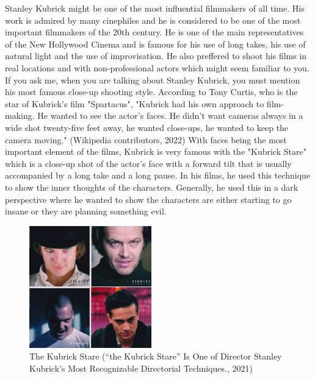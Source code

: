\documentclass[12pt]{article}
\begin{document}
\par
Stanley Kubrick might be one of the most influential filmmakers of all time. His work is admired by many cinephiles and
he is considered to be one of the most important filmmakers of the 20th century.
He is one of the main representatives of the New Hollywood Cinema and is famous for his use of long takes,
his use of natural light and the use of improvisation. He also preffered to shoot his films in real locations
and with non-professional actors which might seem familiar to you.
\\
If you ask me, when you are talking about Stanley Kubrick, you must mention his most famous close-up shooting style. According to Tony Curtis,
who is the star of Kubrick's film "Spartacus", "Kubrick had his own approach to film-making. He wanted to see the actor's faces.
He didn't want cameras always in a wide shot twenty-five feet away, he wanted close-ups, he wanted to keep the camera moving." (Wikipedia contributors, 2022)
With faces being the most important element of the films, Kubrick is very famous with the "Kubrick Stare" which is a close-up shot of the actor's
face with a forward tilt that is usually accompanied by a long take and a long pause. In his films,
he used this technique to show the inner thoughts of the characters. Generally, he used this in a dark perspective where he wanted to show
the characters are either starting to go insane or they are planning something evil.
\\

\begin{figure}[h]
        \begin{center}
                \includegraphics[width=200px]{k_stare}
                \caption{The Kubrick Stare (“the Kubrick Stare” Is One of Director Stanley Kubrick’s Most Recognizable Directorial Techniques., 2021)}
        \end{center}
\end{figure}
\end{document}
